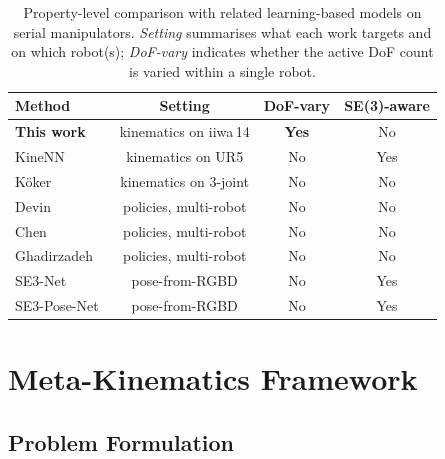 \documentclass[conference]{IEEEtran}
\begin{document}
\begin{table}[!t]
\renewcommand{\arraystretch}{1.15}
\caption{Property-level comparison with related learning-based models on serial manipulators. \emph{Setting} summarises what each work targets and on which robot(s); \emph{DoF-vary} indicates whether the active DoF count is varied within a single robot.}
\label{tab:propcomp}
\centering
\footnotesize
\begin{tabular}{lccc}
\toprule
Method & Setting & DoF-vary & SE(3)-aware \\
\midrule
\textbf{This work} & kinematics on iiwa\,14 & \textbf{Yes} & No \\
KineNN~\cite{diprasetya2025} & kinematics on UR5 & No & Yes \\
K{\"o}ker~\cite{koker2004} & kinematics on 3-joint & No & No \\
Devin~\cite{devin2017} & policies, multi-robot & No & No \\
Chen~\cite{chen2018} & policies, multi-robot & No & No \\
Ghadirzadeh~\cite{ghadirzadeh2021} & policies, multi-robot & No & No \\
SE3-Net~\cite{byravan2017} & pose-from-RGBD & No & Yes \\
SE3-Pose-Net~\cite{byravan2018} & pose-from-RGBD & No & Yes \\
\bottomrule
\end{tabular}
\end{table}

\section{Meta-Kinematics Framework}\label{sec:method}

\subsection{Problem Formulation}
\end{document}
